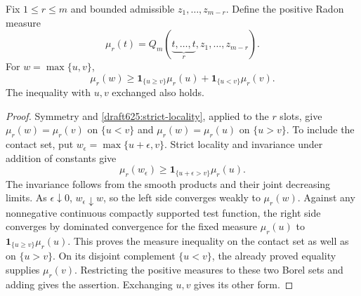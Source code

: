 \begin{theorem}\label{draft625:maximum-measure}
Fix $1\leq r\leq m$ and bounded admissible
$z_1,\ldots,z_{m-r}$. Define the positive Radon measure
\[
 \mu_r(t)=Q_m(\underbrace{t,\ldots,t}_{r},z_1,\ldots,z_{m-r}).
\]
For $w=\max\{u,v\}$,
\[
 \mu_r(w)\geq\mathbf1_{\{u\geq v\}}\mu_r(u)
                  +\mathbf1_{\{u<v\}}\mu_r(v).
\]
The inequality with $u,v$ exchanged also holds.
\end{theorem}
\begin{proof}
Symmetry and \cref{draft625:strict-locality}, applied to the $r$ slots, give
$\mu_r(w)=\mu_r(v)$ on $\{u<v\}$ and $\mu_r(w)=\mu_r(u)$ on $\{u>v\}$.
To include the contact set, put $w_\epsilon=\max\{u+\epsilon,v\}$.
Strict locality and invariance under addition of constants give
\[
 \mu_r(w_\epsilon)\geq
                   \mathbf1_{\{u+\epsilon>v\}}\mu_r(u).
\]
The invariance follows from the smooth products and their joint
decreasing limits. As $\epsilon\downarrow0$,
$w_\epsilon\downarrow w$, so the left side converges weakly to
$\mu_r(w)$. Against any nonnegative continuous compactly supported
test function, the right side converges by dominated convergence
for the fixed measure $\mu_r(u)$ to
$\mathbf1_{\{u\geq v\}}\mu_r(u)$. This proves the measure inequality
on the contact set as well as on $\{u>v\}$. On its disjoint
complement $\{u<v\}$, the already proved equality supplies
$\mu_r(v)$. Restricting the positive measures to these two Borel sets
and adding gives the assertion. Exchanging $u,v$ gives its other
form.
\end{proof}
